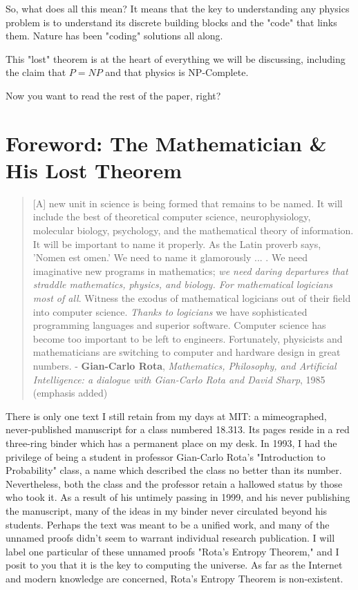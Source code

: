 \documentclass{report}
\begin{document}
So, what does all this mean? It means that the key to understanding any physics problem is to understand its discrete building blocks and the "code" that links them. Nature has been "coding" solutions all along.

This "lost" theorem is at the heart of everything we will be discussing, including the claim that \(P=NP\) and that physics is NP-Complete.

Now you want to read the rest of the paper, right?

\section*{Foreword: The Mathematician \& His Lost Theorem}

\begin{quotation}
    [A] new unit in science is being formed that remains to be named. It will include the best of theoretical computer science, neurophysiology, molecular biology, psychology, and the mathematical theory of information. It will be important to name it properly. As the Latin proverb says, 'Nomen est omen.' We need to name it glamorously ... . 
    We need imaginative new programs in mathematics;  \textit{we need daring departures that straddle mathematics, physics, and biology. For mathematical logicians most of all}. Witness the exodus of mathematical logicians out of their field into computer science. \emph{Thanks to logicians} we have sophisticated programming languages and superior software. Computer science has become too important to be left to engineers. Fortunately, physicists and mathematicians are switching to computer and hardware design in great numbers.
    \newline
    - \textbf{Gian-Carlo Rota}, \textit{Mathematics, Philosophy, and Artificial Intelligence: a dialogue with Gian-Carlo Rota and David Sharp}, 1985\cite{Rota1985} (emphasis added) 
\end{quotation}

There is only one text I still retain from my days at MIT: a mimeographed, never-published manuscript for a class numbered 18.313. Its pages reside in a red three-ring binder which has a permanent place on my desk. In 1993, I had the privilege of being a student in professor Gian-Carlo Rota's "Introduction to Probability" class, a name which described the class no better than its number. Nevertheless, both the class and the professor retain a hallowed status by those who took it. As a result of his untimely passing in 1999, and his never publishing the manuscript, many of the ideas in my binder never circulated beyond his students. Perhaps the text was meant to be a unified work, and many of the unnamed proofs didn't seem to warrant individual research publication. I will label one particular of these unnamed proofs "Rota's Entropy Theorem," and I posit to you that it is the key to computing the universe. As far as the Internet and modern knowledge are concerned, Rota's Entropy Theorem is non-existent.
\end{document}
